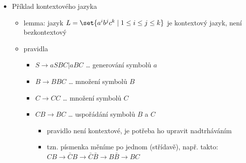 \begin{itemize}
\begin{itemize}
\begin{itemize}
\begin{itemize}
\item doplněk: obrátíme \quotedblbase{}koncovost\textquotedblleft{} stavů
\item průnik, sjednocení, rozdíl
\begin{itemize}
\item zkonstruujeme součinový automat $(Q_1\times Q_2,\Sigma,\delta,(q_{0_1},q_{0_2}),F)$
\begin{itemize}
\item kde $\delta((p,q),x)=(\delta_1(p,x),\delta_2(q,x))$
\end{itemize}
\item průnik \dots{} $F=F_1\times F_2$
\item sjednocení \dots{} $F=(F_1\times Q_2)\cup(Q_1\times F_2)$
\item rozdíl \dots{} $F=F_1\times (Q_2-F_2)$
\end{itemize}
\end{itemize}
\item bezkontextové jazyky jsou uzavřené na sjednocení, konkatenaci, iteraci, reverzi, naopak neuzavřené na průnik (ale jsou uzavřené na průnik s regulárním jazykem)
\item uzavřenost můžeme použít k důkazu regularity nebo bezkontextovosti
\item ale můžeme ji použít i k důkazu neregularity jazyka $L$ - kdybychom aplikací uzavřených operací na jazyk $L$ a regulární jazyky dostali jazyk $L'$, který zjevně není regulární (např. $0^i1^i$)
\end{itemize}
\end{itemize}
\item Příklad kontextového jazyka
\begin{itemize}
\item lemma: jazyk $L=\set{a^ib^jc^k\mid1\leq i\leq j\leq k}$ je kontextový jazyk, není bezkontextový
\item pravidla
\begin{itemize}
\item $S\to aSBC|aBC$ \dots{} generování symbolů $a$
\item $B\to BBC$ \dots{} množení symbolů $B$
\item $C\to CC$ \dots{} množení symbolů $C$
\item $CB\to BC$ \dots{} uspořádání symbolů $B$ a $C$
\begin{itemize}
\item pravidlo není kontextové, je potřeba ho upravit nadtrháváním
\item tzn. písmenka měníme po jednom (střídavě), např. takto: $CB\to\bar CB\to \bar C\bar B\to B\bar B\to BC$

\end{itemize}
\end{itemize}
\end{itemize}
\end{itemize}
